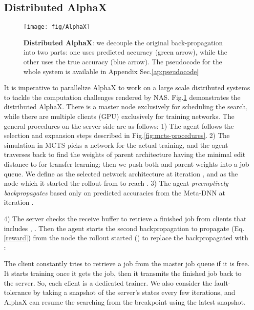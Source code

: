 \documentclass[10pt,twocolumn,letterpaper]{article}
\begin{document}
\subsection{Distributed AlphaX}
\label{sec:distributed}

\begin{figure}
  \begin{center}
    \texttt{[image: fig/AlphaX]}
  \end{center}
  \caption{\textbf{Distributed AlphaX}: we decouple the original back-propagation into two parts: one uses predicted accuracy (green arrow), while the other uses the true accuracy (blue arrow).  The pseudocode for the whole system is available in Appendix Sec.\ref{ap:pseudocode} }
  \vspace{-0.1in}
  \label{distributed_alphaX}
\end{figure}

It is imperative to parallelize AlphaX to work on a large scale distributed systems to tackle the computation challenges rendered by NAS.
Fig.\ref{distributed_alphaX} demonstrates the distributed AlphaX. There is a master node exclusively for scheduling the search, while there are multiple clients (GPU) exclusively for training networks. The general procedures on the server side are as follows: 1) The agent follows the selection and expansion steps described in Fig.\ref{fig:mcts-procedures}. 2) The simulation in MCTS picks a network  for the actual training, and the agent traverses back to find the weights of parent architecture having the minimal edit distance to  for transfer learning; then we push both  and parent weights into a job queue. We define  as the selected network architecture at iteration , and  as the node which it started the rollout from to reach . 3) The agent {\it preemptively backpropagates}  based only on predicted accuracies from the Meta-DNN at iteration .

4) The server checks the receive buffer to retrieve a finished job from clients that includes , .
Then the agent starts the second backpropagation to propagate  (Eq. \ref{reward}) from the node the rollout started () to replace the backpropagated  with :









The client constantly tries to retrieve a job from the master job queue if it is free. It starts training once it gets the job, then it transmits the finished job back to the server. So, each client is a dedicated trainer. We also consider the fault-tolerance by taking a snapshot of the server's states every few iterations, and AlphaX can resume the searching from the breakpoint using the latest snapshot.
\end{document}
